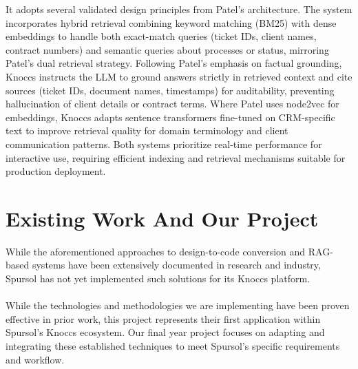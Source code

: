 It adopts several validated design principles from Patel's architecture. The system incorporates hybrid retrieval combining keyword matching (BM25) with dense embeddings to handle both exact-match queries (ticket IDs, client names, contract numbers) and semantic queries about processes or status, mirroring Patel's dual retrieval strategy. Following Patel's emphasis on factual grounding, Knoccs instructs the LLM to ground answers strictly in retrieved context and cite sources (ticket IDs, document names, timestamps) for auditability, preventing hallucination of client details or contract terms. Where Patel uses node2vec for embeddings, Knoccs adapts sentence transformers fine-tuned on CRM-specific text to improve retrieval quality for domain terminology and client communication patterns. Both systems prioritize real-time performance for interactive use, requiring efficient indexing and retrieval mechanisms suitable for production deployment.\\

\section{Existing Work And Our Project}
While the aforementioned approaches to design-to-code conversion and RAG-based systems have been extensively documented in research and industry, Spursol has not yet implemented such solutions for its Knoccs platform. 
\\\\
While the technologies and methodologies we are implementing have been proven effective in prior work, this project represents their first application within Spursol's Knoccs ecosystem. Our final year project focuses on adapting and integrating these established techniques to meet Spursol's specific requirements and workflow.
